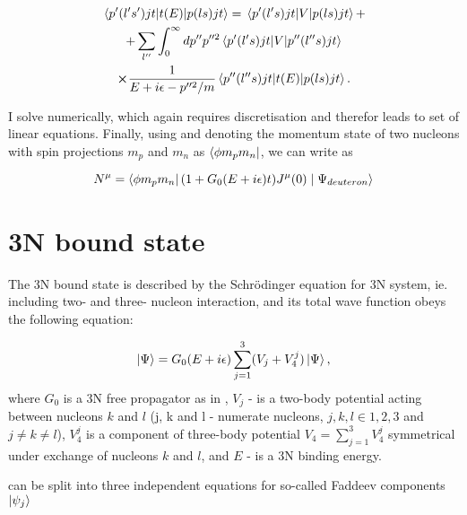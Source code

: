     \begin{multline}
        \matrixel{p^\prime (l^\prime s^\prime)jt}{t(E)}{p(ls)jt} = 
        \matrixel{p^\prime (l^\prime s)jt}{V}{p(ls)jt} + \\
        +\sum_{l^{\prime\prime}} \int_0^\infty dp^{\prime \prime} p^{\prime \prime 2}
        \matrixel{p^\prime (l^\prime s)jt}{V}{p^{\prime\prime}(l^{\prime\prime} s)jt} \\
        \cross \frac{1}{E + i\epsilon - p^{\prime \prime 2}/m}
        \matrixel{p^{\prime \prime} (l^{\prime \prime} s)jt}{t(E)}{p(l s)jt}.      
        \label{lse_pwd_reduced}
    \end{multline}

    I solve  numerically, which again requires discretisation
    and therefor leads to set of linear equations.
    Finally, using  and denoting the momentum state of two nucleons
    with spin projections $m_p$ and $m_n$ as $\bra{\phi m_p m_n}$, we can write  as
    
    \begin{equation}
        N^\mu = \bra{\phi m_p m_n} (1 + G_0(E + i\epsilon) t) J^\mu(0) \mid \Psi_{deuteron} \rangle
        \label{main_top}
    \end{equation}

    
\section{3N bound state}

    The 3N bound state is described by the Schr\"{o}dinger equation for 3N system,
    ie. including two- and three- nucleon interaction,
    and its total wave function obeys the following equation:

    \begin{equation}
        \ket{\Psi} = G_0(E+i\epsilon)\sum_{j=1}^3 (V_j + V_4^j) \ket{\Psi},
        \label{psi3_total}
    \end{equation}
    where $G_0$ is a 3N free propagator as in , $V_j$ - is a two-body potential
    acting between nucleons $k$ and $l$ (j, k and l - numerate nucleons, $j,k,l \in {1,2,3}$ and $j \neq k \neq l$),
    $V_4^j$ is a component of three-body potential $V_4 = \sum_{j=1}^3 V_4^j$
    symmetrical under exchange of nucleons $k$ and $l$,
    and $E$ - is a 3N binding energy.

     can be split into three independent equations for
    so-called Faddeev components $\ket{\psi_j}$

